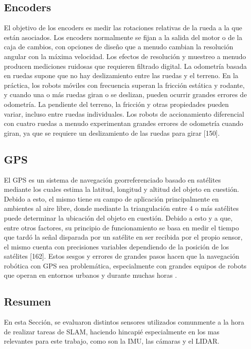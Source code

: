 \subsection{Encoders}
El objetivo de los encoders es medir las rotaciones relativas de la rueda a la que están asociados. Los encoders normalmente se fijan a la salida del motor o de la caja de cambios, con opciones de diseño que a menudo cambian la resolución angular con la máxima velocidad. Los efectos de resolución y muestreo a menudo producen mediciones ruidosas que requieren filtrado digital. La odometría basada en ruedas supone que no hay deslizamiento entre las ruedas y el terreno. En la práctica, los robots móviles con frecuencia superan la fricción estática y rodante, y cuando una o más ruedas giran o se deslizan, pueden ocurrir grandes errores de odometría. La pendiente del terreno, la fricción y otras propiedades pueden variar, incluso entre ruedas individuales. Los robots de accionamiento diferencial con cuatro ruedas a menudo experimentan grandes errores de odometría cuando giran, ya que se requiere un deslizamiento de las ruedas para girar [150].

\subsection{GPS}
El GPS es un sistema de navegación georreferenciado basado en satélites mediante los cuales estima la latitud, longitud y altitud del objeto en cuestión. Debido a esto, el mismo tiene su campo de aplicación principalmente en ambientes al aire libre, donde mediante la triangulación entre 4 o más satélites puede determinar la ubicación del objeto en cuestión. Debido a esto y a que, entre otros factores, su principio de funcionamiento se basa en medir el tiempo que tardó la señal disparada por un satélite en ser recibida por el propio sensor, el mismo cuenta con precisiones variables dependiendo de la posición de los satélites [162]. Estos sesgos y errores de grandes pasos hacen que la navegación robótica con GPS sea problemática, especialmente con grandes equipos de robots que operan en entornos urbanos y durante muchas horas \cite{carlson2010}.

\subsection{Resumen}
En esta Sección, se evaluaron distintos sensores utilizados comunmente a la hora de realizar tareas de SLAM, haciendo hincapié especialmente en los mas relevantes para este trabajo, como son la IMU, las cámaras y el LIDAR.